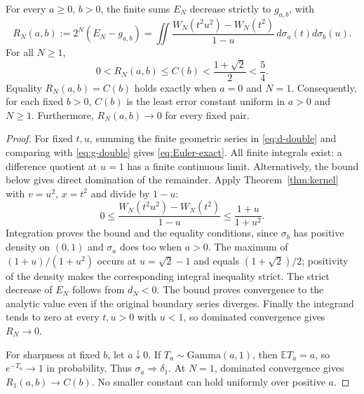 \begin{theorem}\label{thm:Euler-uniform}
For every $a\geq0$, $b>0$, the finite sums $E_N$ decrease strictly to
$g_{a,b}$, with
\begin{equation}\label{eq:Euler-exact}
 R_N(a,b):=2^N(E_N-g_{a,b})
 =\iint\frac{W_N(t^2u^2)-W_N(t^2)}{1-u}\,
                       d\sigma_a(t)d\sigma_b(u).
\end{equation}
For all $N\geq1$,
\begin{equation}\label{eq:Euler-b-bound}
 0<R_N(a,b)\leq C(b)<\frac{1+\sqrt2}{2}<\frac54.
\end{equation}
Equality $R_N(a,b)=C(b)$ holds exactly when $a=0$ and $N=1$.
Consequently, for each fixed $b>0$, $C(b)$ is the least error
constant uniform in $a>0$ and $N\geq1$. Furthermore,
$R_N(a,b)\to0$ for every fixed pair.
\end{theorem}
\begin{proof}
For fixed $t,u$, summing the finite geometric series in
\eqref{eq:d-double} and comparing with \eqref{eq:g-double} gives
\eqref{eq:Euler-exact}. All finite integrals exist: a difference
quotient at $u=1$ has a finite continuous limit. Alternatively, the
bound below gives direct domination of the remainder. Apply
Theorem~\ref{thm:kernel} with $v=u^2$, $x=t^2$ and divide by $1-u$:
\[
 0\leq\frac{W_N(t^2u^2)-W_N(t^2)}{1-u}
       \leq\frac{1+u}{1+u^2}.
\]
Integration proves the bound and the equality conditions, since
$\sigma_b$ has positive density on $(0,1)$ and $\sigma_a$ does too
when $a>0$. The maximum of $(1+u)/(1+u^2)$ occurs at
$u=\sqrt2-1$ and equals $(1+\sqrt2)/2$; positivity of the density
makes the corresponding integral inequality strict.
The strict decrease of $E_N$ follows from $d_N<0$. The bound proves
convergence to the analytic value even if the original boundary series
diverges. Finally the integrand tends to zero at every $t,u>0$ with
$u<1$, so dominated convergence gives $R_N\to0$.

For sharpness at fixed $b$, let $a\downarrow0$. If
$T_a\sim\mathrm{Gamma}(a,1)$, then $\mathbb E T_a=a$, so
$e^{-T_a}\to1$ in probability. Thus $\sigma_a\Rightarrow\delta_1$.
At $N=1$, dominated convergence gives $R_1(a,b)\to C(b)$.
No smaller constant can hold uniformly over positive $a$.
\end{proof}


